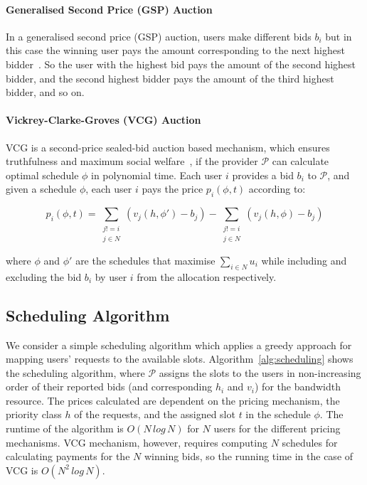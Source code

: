 \paragraph{Generalised Second Price (GSP) Auction}
In a generalised second price (GSP) auction, users make different bids $b_i$ but in this case the winning user pays the amount corresponding to the next highest bidder~\cite{Jana2011}. 
So the user with the highest bid pays the amount of the second highest bidder, and the second highest bidder pays the amount of the third highest bidder, and so on. 


\paragraph{Vickrey-Clarke-Groves (VCG) Auction}
VCG is a second-price sealed-bid auction based mechanism, which ensures truthfulness and maximum social welfare~\cite{Nisan2001},
if the provider $\mathcal{P}$ can calculate optimal schedule $\phi$ in polynomial time.
Each user $i$ provides a bid $b_i$ to $\mathcal{P}$, and given a schedule $\phi$, each user $i$ pays the price $p_i(\phi, t)$ according to:

\begin{equation}
	p_i(\phi, t) = \sum_{\substack{
						j!= i \\ 
						j \in N}} 
					\left( v_j(h,\phi') - b_j \right) - 
					\sum_{\substack{
						j!= i \\ 
						j \in N}} 
					\left( v_j(h,\phi) - b_j \right)
\end{equation}

where $\phi$ and $\phi'$ are the schedules that maximise $\displaystyle\sum_{i \in N} u_i$ while including and excluding the bid $b_i$ by user $i$ from the allocation respectively.

\subsection{Scheduling Algorithm}

We consider a simple scheduling algorithm which applies a greedy approach for mapping users' requests to the available slots.
Algorithm~\ref{alg:scheduling} shows the scheduling algorithm, where $\mathcal{P}$ assigns the slots to the users in non-increasing order of their reported bids (and corresponding $h_i$ and $v_i$) for the bandwidth resource.
The prices calculated are dependent on the pricing mechanism, the priority class $h$ of the requests, and the assigned slot $t$ in the schedule $\phi$.
The runtime of the algorithm is $O(N\, log\, N)$ for $N$ users for the different pricing mechanisms.
VCG mechanism, however, requires computing $N$ schedules for calculating payments for the $N$ winning bids, so the running time in the case of VCG is $O(N^2\, log\, N)$. %

